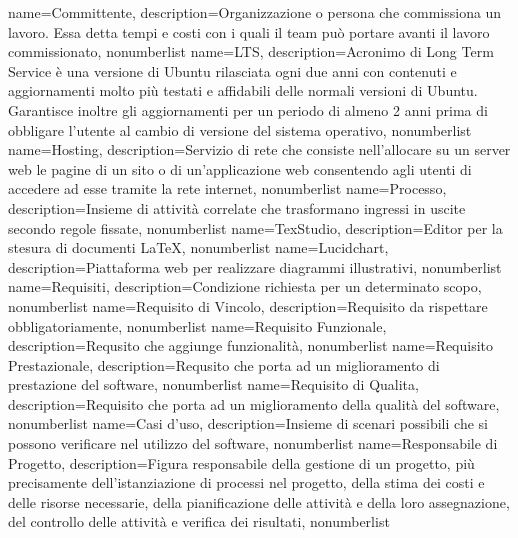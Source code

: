 {
	name={Committente},
	description={Organizzazione o persona che commissiona un lavoro. Essa detta tempi e costi con i quali il team può portare avanti il lavoro commissionato},
	nonumberlist 
}
{
	name={LTS},
	description={Acronimo di Long Term Service è una versione di Ubuntu rilasciata ogni due anni con contenuti e aggiornamenti molto più testati e affidabili delle normali versioni di Ubuntu. Garantisce inoltre gli aggiornamenti per un periodo di almeno 2 anni prima di obbligare l'utente al cambio di versione del sistema operativo},
	nonumberlist 
}
{
	name={Hosting},
	description={Servizio di rete che consiste nell'allocare su un server web le pagine di un sito o di un'applicazione web consentendo agli utenti di accedere ad esse tramite la rete internet},
	nonumberlist 
}
{
	name={Processo},
	description={Insieme di attività correlate che trasformano ingressi in uscite secondo regole fissate},
	nonumberlist 
}
{
	name={TexStudio},
	description={Editor per la stesura di documenti \LaTeX},
	nonumberlist 
}
{
	name={Lucidchart},
	description={Piattaforma web per realizzare diagrammi illustrativi},
	nonumberlist 
}
{
	name={Requisiti},
	description={Condizione richiesta per un determinato scopo},
	nonumberlist 
}
{
	name={Requisito di Vincolo},
	description={Requisito da rispettare obbligatoriamente},
	nonumberlist 
}
{
	name={Requisito Funzionale},
	description={Requsito che aggiunge funzionalità},
	nonumberlist 
}
{
	name={Requisito Prestazionale},
	description={Requsito che porta ad un miglioramento di prestazione del software},
	nonumberlist 
}
{
	name={Requisito di Qualita},
	description={Requisito che porta ad un miglioramento della qualità del software},
	nonumberlist 
}
{
	name={Casi d'uso},
	description={Insieme di scenari possibili che si possono verificare nel	utilizzo del software},
	nonumberlist 
}
{
	name={Responsabile di Progetto},
	description={Figura responsabile della gestione di un progetto, più precisamente dell'istanziazione di processi nel progetto, della stima dei costi e delle risorse necessarie, della pianificazione delle attività e della loro assegnazione, del controllo delle attività e verifica dei risultati},
	nonumberlist 
}

